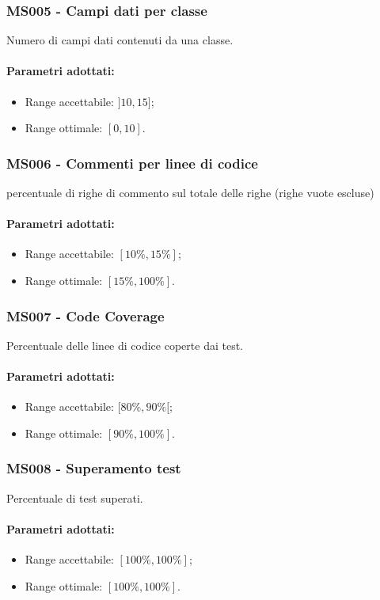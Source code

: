 \subsubsection{MS005 - Campi dati per classe}\mbox{}
Numero di campi dati contenuti da una classe. 
\paragraph{Parametri adottati:}
\begin{itemize}
	\item Range accettabile: $ ]10,15]$;
	\item Range ottimale: $[0,10]$.
\end{itemize}

\subsubsection{MS006 - Commenti per linee di codice}\mbox{}
percentuale di righe di commento sul totale delle righe (righe vuote escluse)
\paragraph{Parametri adottati:}
\begin{itemize}
	\item Range accettabile: $[10\%,15\%]$;
	\item Range ottimale: $[15\%,100\%]$.
\end{itemize}

\subsubsection{MS007 - Code Coverage}\mbox{}
Percentuale delle linee di codice coperte dai test.
\paragraph{Parametri adottati:}
\begin{itemize}
	\item Range accettabile: $[80\%,90\%[$;
	\item Range ottimale: $[90\%,100\%]$.
\end{itemize}
\subsubsection{MS008 - Superamento test}\mbox{}
Percentuale di test superati. 
\paragraph{Parametri adottati:}
\begin{itemize}
	\item Range accettabile: $[100\%,100\%]$;
	\item Range ottimale: $[100\%,100\%]$.
\end{itemize}

